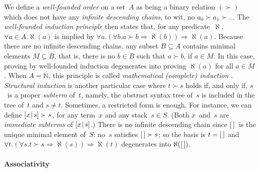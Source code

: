 We define a \emph{well\hyp{}founded order}
\citep{Winskel_1993} on a
set~\(A\) as being a binary relation \((\succ)\) which does not have
any \emph{infinite descending chains}, to wit, no \(a_0 \succ a_1 \succ \dots\) The
\emph{well\hyp{}founded induction principle} then states that, for any
predicate~\(\aleph\), \(\forall a \in A.\aleph(a)\) is implied by
\(\forall a.(\forall b.a \succ b \Rightarrow \aleph(b)) \Rightarrow
\aleph(a)\). Because there are no infinite descending chains, any
subset \(B \subseteq A\) contains minimal elements \(M \subseteq B\),
that is, there is no \(b \in B\) such that \(a \succ b\), if \(a \in
M\). In this case, proving by well\hyp{}founded induction degenerates
into proving \(\aleph(a)\) for all \(a \in M\). When \(A=\mathbb{N}\),
this principle is called \emph{mathematical (complete) induction}
\citep{Buck_1963}. \emph{Structural induction} is another particular case where \(t \succ s\) holds if, and
only if, \(s\)~is a proper
\emph{subterm}
of~\(t\), namely, the abstract syntax tree of~\(s\) is included in the
tree of~\(t\) and \(s \neq t\). Sometimes, a restricted form is
enough. For instance, we can define \([{x}\!\mid\!{s}] \succ
s\), for any term~\(x\) and any stack~\(s \in
S\). (Both \(x\)~and~\(s\) are \emph{immediate
  subterms} of
\([{x}\!\mid\!{s}]\).) There is no infinite
descending chain since \([\,]\)~is the unique minimal element of~\(S\):
no~\(s\) satisfies \([\,] \succ s\); so the basis is \(t=[\,]\) and
\(\forall t.(\forall s.t \succ s \Rightarrow \aleph(s)) \Rightarrow
\aleph(t)\) degenerates into \(\aleph([\,])\).

\paragraph{Associativity}
\label{proof:assoc_cat}

